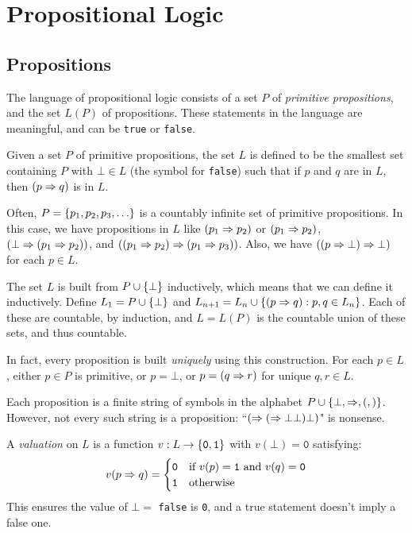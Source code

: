 \documentclass{article}
\begin{document}
\makecover

\section{Propositional Logic}
\subsection{Propositions}
\label{section-propositional-logic}

The language of propositional logic consists of a set $P$ of \textit{primitive propositions}, and the set $L(P)$ of propositions. These statements in the language are meaningful, and can be \texttt{true} or \texttt{false}.

\begin{definition}
	\label{set-of-propositions}
    Given a set $P$ of primitive propositions, the set $L$ is defined to be the smallest set containing $P$ with $\bot \in L$ (the symbol for \texttt{false}) such that if $p$ and $q$ are in $L$, then $(p \Rightarrow q)$ is in $L$.
\end{definition}

Often, $P = \set{p_1, p_2, p_3, \dots}$ is a countably infinite set of primitive propositions. In this case, we have propositions in $L$ like $(p_1 \Rightarrow p_2)$ or  $(p_1 \Rightarrow p_2)$,  $(\bot \Rightarrow (p_1 \Rightarrow p_2))$, and $((p_1 \Rightarrow p_2) \Rightarrow (p_1 \Rightarrow p_3))$. Also, we have $((p \Rightarrow \bot) \Rightarrow \bot)$ for each $p \in L$.

The set $L$ is built from $P \cup \left\lbrace \bot \right\rbrace$ inductively, which means that we can define it inductively. Define $L_1 = P \cup \left\lbrace \bot \right\rbrace$ and $L_{n+1} = L_n \cup \left\lbrace (p \Rightarrow q) : p, q \in L_n \right\rbrace$. Each of these are countable, by induction, and $L = L(P)$ is the countable union of these sets, and thus countable.

In fact, every proposition is built \textit{uniquely} using this construction. For each $p \in L$, either $p \in P$ is primitive, or $p = \bot$, or $p = (q \Rightarrow r)$ for unique $q, r \in L$.

\begin{note}
	Each proposition is a finite string of symbols in the alphabet $P \cup \left\lbrace \bot, \Rightarrow, (, ) \right\rbrace$. However, not every such string is a proposition: ``$( \Rightarrow ( \Rightarrow \bot \bot ) \bot )$" is nonsense.
\end{note}

\begin{definition}[Valuation]
	\label{valuation}
    A \textit{valuation} on $L$ is a function $v: L \to \left\lbrace \texttt{0}, \texttt{1} \right\rbrace$ with $v(\bot) = \texttt{0}$ satisfying:
	\[
	v(p \Rightarrow q) = \begin{cases}
		\texttt{0} & \text{if } v(p) = \texttt{1} \text{ and } v(q) = \texttt{0} \\
		\texttt{1} & \!\mathrel{\, \text{otherwise}}
	\end{cases}
	\]
	This ensures the value of $\bot = $ \texttt{false} is \texttt{0}, and a true statement doesn't imply a false one.
\end{definition}
\end{document}
